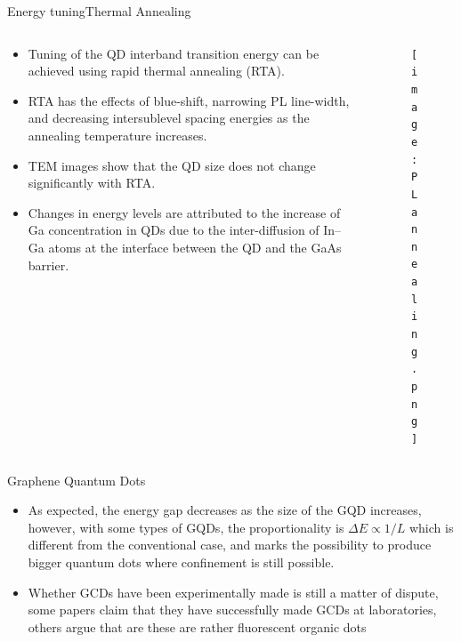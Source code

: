 \documentclass{beamer}
\begin{document}
\begin{frame}{Energy tuning}{Thermal Annealing}
    \begin{columns}
        \begin{column}{0.65\textwidth}
            \begin{itemize}
                \item Tuning of the QD interband transition energy can be achieved using rapid thermal annealing (RTA).
                \item RTA has the effects of blue-shift, narrowing PL line-width, and decreasing intersublevel spacing energies as the annealing temperature increases.
                \item TEM images show that the QD size does not change significantly with RTA.
                \item Changes in energy levels are attributed to the increase of Ga concentration in QDs due to the inter-diffusion of In–Ga atoms at the interface between the QD and the GaAs barrier.
            \end{itemize}
        \end{column}
        \begin{column}{0.5\textwidth}
            \begin{figure}
                \centering
                \texttt{[image: PL annealing.png]}
                \label{fig:annealing}
            \end{figure}
        \end{column}
    \end{columns}
\end{frame}


\begin{frame}{Graphene Quantum Dots}
    \begin{itemize}
        \item As expected, the energy gap decreases as the size of the GQD increases, however, with some types of GQDs, the proportionality is $\Delta E \propto 1/L$ which is different from the conventional case, and marks the possibility to produce bigger quantum dots where confinement is still possible.
        \item Whether GCDs have been experimentally made is still a matter of dispute, some papers claim that they have successfully made GCDs at laboratories, others argue that are these are rather fluorescent organic dots
    \end{itemize}
    
\end{frame}
\end{document}
